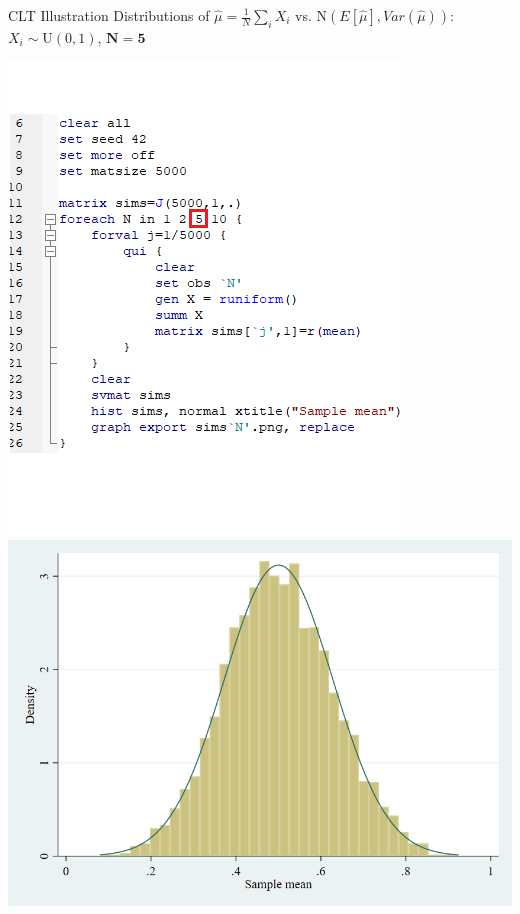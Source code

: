 \documentclass[11pt,english,handout]{beamer}
\begin{document}
\begin{frame}{CLT Illustration}
	\vspace{0.2cm}
	Distributions of $\hat{\mu}=\frac{1}{N}\sum_i X_i$ vs. $\mathrm{N}(E[\hat\mu],Var(\hat{\mu}))$: $X_i\sim \mathrm{U}(0,1)$, $\mathbf{N=5}$
	
	\begin{center}
		\includegraphics[scale=0.4]{Stata3.png} \includegraphics[scale=0.25]{sims5.png}
	\end{center}
	
\end{frame}
\end{document}
